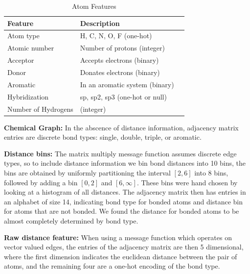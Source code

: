 \documentclass{article}
\begin{document}
\begin{table}[t]
\centering
\caption{Atom Features}
\label{tb:features}
\begin{tabular}{lll}
\hline
\abovespace\belowspace
Feature             & Description                                      &  \\
\hline
\abovespace

Atom type           & H, C, N, O, F (one-hot)                  &  \\
Atomic number       & Number of protons (integer)                      &  \\
Acceptor            & Accepts electrons (binary)        &  \\
Donor               & Donates electrons (binary)        &  \\
Aromatic            & In an aromatic system (binary) &  \\
Hybridization       & sp, sp2, sp3 (one-hot or null)                   &  \\
Number of Hydrogens & (integer)        & 
\end{tabular}


\end{table}


\textbf{Chemical Graph:}
In the abscence of distance information, adjacency matrix entries are discrete bond types: single, double, triple, or aromatic.

\textbf{Distance bins:}
The matrix multiply message function assumes discrete edge types, so to include distance information we bin bond distances into 10 bins, the bins are obtained by uniformly partitioning the interval $[2,6]$ into 8 bins, followed by adding a bin $[0,2]$ and $[6,\infty]$. These bins were hand chosen by looking at a histogram of all distances. The adjacency matrix then has entries in an alphabet of size 14, indicating bond type for bonded atoms and distance bin for atoms that are not bonded. We found the distance for bonded atoms to be almost completely determined by bond type.

\textbf{Raw distance feature:}
When using a message function which operates on vector valued edges, the entries of the adjacency matrix are then 5 dimensional, where the first dimension indicates the euclidean distance between the pair of atoms, and the remaining four are a one-hot encoding of the bond type. 
\end{document}
